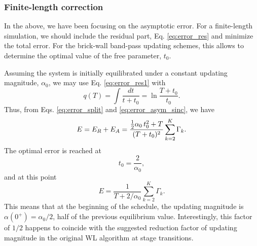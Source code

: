 \documentclass[reprint, floatfix]{revtex4-1}
\begin{document}
\subsubsection{\label{sec:finlencorr}
Finite-length correction}



In the above, we have been focusing on
the asymptotic error.
%
For a finite-length simulation,
we should include the residual part,
Eq. \eqref{eq:error_res}
and minimize the total error.
%
For the brick-wall band-pass updating schemes,
this allows to determine the optimal value
of the free parameter, $t_0$.

Assuming the system is initially equilibrated
under a constant updating magnitude, $\alpha_0$,
we may use Eq. \eqref{eq:error_res1} with
$$
q(T)
=
\int \frac{ dt } { t + t_0 }
=
\ln \frac{ T + t_0 } { t_0 }.
$$
%
Thus, from Eqs. \eqref{eq:error_split}
and \eqref{eq:error_asym_sinc}, we have
%
\begin{equation}
  E
  =
  E_R + E_A
  =
  \frac { \frac 1 2 \alpha_0 \, t_0^2 + T }
        {          ( T + t_0 )^2          }
  \sum_{ k = 2 }^K \Gamma_k
  .
\notag
\end{equation}
%
The optimal error is reached at
%
\begin{equation}
  t_0
  =
  \frac{     2    }
       { \alpha_0 }
  ,
\label{eq:t0_sinc}
\end{equation}
%
and at this point
%
\begin{equation}
  E
  =
  \frac{        1         }
       { T + 2 / \alpha_0 }
  \sum_{ k = 2 }^K
    \Gamma_k
  .
\label{eq:error_sinc}
\end{equation}
%
This means that at the beginning of the schedule,
the updating magnitude is
$\alpha(0^+) = \alpha_0 / 2$,
half of the previous equilibrium value.
%
Interestingly, this factor of $1/2$
happens to coincide with the suggested
reduction factor of updating magnitude
in the original WL algorithm\cite{wang2001, wang2001pre}
at stage transitions.




%
%
\end{document}
